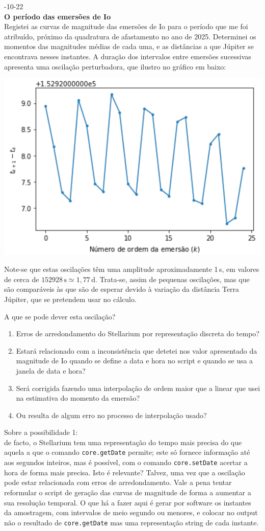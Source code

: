 \documentclass[]{article}
\newcommand{\newlog}[2]{%
  \par
  \vspace{\baselineskip}
  \noindent
  #1\\
  \textbf{#2}\\
}
\begin{document}
\newlog{2024-10-22}{O período das emersões de Io}
Registei as curvas de magnitude das emersões de Io para o período que me foi
atribuído, próximo da quadratura de afastamento no ano de 2025.  Determinei os
momentos das magnitudes médias de cada uma, e as distâncias a que Júpiter se
encontrava nesses instantes. A duração dos intervalos entre emersões sucessivas
apresenta uma oscilação perturbadora, que ilustro no gráfico em baixo:
\begin{center}
  \includegraphics[width=0.5\linewidth]{figs/2024-10-22_a.png}
\end{center}
Note-se que estas oscilações têm uma amplitude aproximadamente 1\,s, em
valores de cerca de $152928\,\text{s}\simeq1,77$\,d. Trata-se, assim de pequenas
oscilações, mas que são comparáveis às que são de esperar devido à variação da
distância Terra Júpiter, que se pretendem usar no cálculo.

A que se pode dever esta oscilação?
\begin{enumerate}
  \item
    Erros de arredondamento do Stellarium por representação discreta do tempo?
  \item
    Estará relacionado com a inconsistência que detetei nos valor apresentado da
    magnitude de Io quando se define a data e hora no script e quando se usa a
    janela de data e hora?
  \item
    Será corrigida fazendo uma interpolação de ordem maior que a linear que
    usei na estimativa do momento da emersão?
  \item
    Ou resulta de algum erro no processo de interpolação usado?
\end{enumerate}

\noindent
Sobre a possibilidade 1:\\
de facto, o Stellarium tem uma representação do tempo mais precisa do que aquela
a que o comando \texttt{core.getDate} permite; este só fornece informação até
aos segundos inteiros, mas é possível, com o comando \texttt{core.setDate}
acertar a hora de forma mais precisa. Isto é relevante? Talvez, uma vez que a
oscilação pode estar relacionada com erros de arredondamento. Vale a pena tentar
reformular o script de geração das curvas de magnitude de forma a aumentar a sua
resolução temporal. O que há a fazer aqui é gerar por software os instantes da
amostragem, com intervalos de meio segundo ou menores, e colocar no output não o
resultado de \texttt{core.getDate} mas uma representação string de cada
instante.
\end{document}
